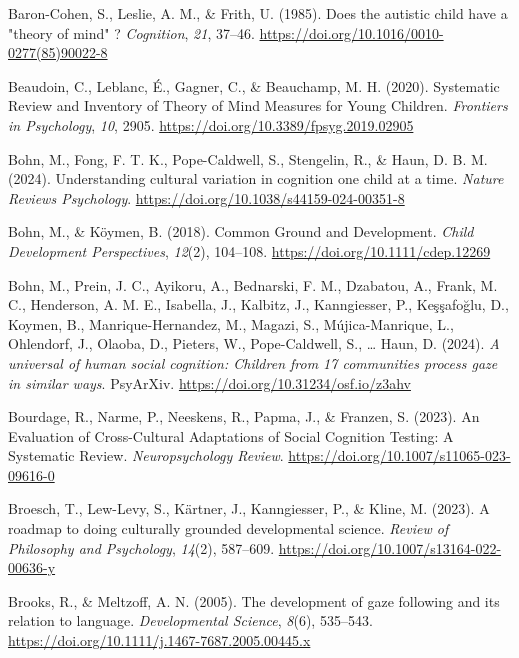 \documentclass[
  man,floatsintext]{apa7}
\newlength{\cslhangindent}
\newenvironment{CSLReferences}[2] %
 {\begin{list}{}{%
  \setlength{\itemindent}{0pt}
  \setlength{\leftmargin}{0pt}
  \setlength{\parsep}{0pt}
  \ifodd #1
   \setlength{\leftmargin}{\cslhangindent}
   \setlength{\itemindent}{-1\cslhangindent}
  \fi
  \setlength{\itemsep}{#2\baselineskip}}}
 {\end{list}}
\begin{document}
\begin{CSLReferences}{1}{0}
Baron-Cohen, S., Leslie, A. M., \& Frith, U. (1985). Does the autistic child have a "theory of mind" ? \emph{Cognition}, \emph{21}, 37--46. \url{https://doi.org/10.1016/0010-0277(85)90022-8}

Beaudoin, C., Leblanc, É., Gagner, C., \& Beauchamp, M. H. (2020). Systematic {Review} and {Inventory} of {Theory} of {Mind Measures} for {Young Children}. \emph{Frontiers in Psychology}, \emph{10}, 2905. \url{https://doi.org/10.3389/fpsyg.2019.02905}

Bohn, M., Fong, F. T. K., Pope-Caldwell, S., Stengelin, R., \& Haun, D. B. M. (2024). Understanding cultural variation in cognition one child at a time. \emph{Nature Reviews Psychology}. \url{https://doi.org/10.1038/s44159-024-00351-8}

Bohn, M., \& Köymen, B. (2018). Common {Ground} and {Development}. \emph{Child Development Perspectives}, \emph{12}(2), 104--108. \url{https://doi.org/10.1111/cdep.12269}

Bohn, M., Prein, J. C., Ayikoru, A., Bednarski, F. M., Dzabatou, A., Frank, M. C., Henderson, A. M. E., Isabella, J., Kalbitz, J., Kanngiesser, P., Keşşafoğlu, D., Koymen, B., Manrique-Hernandez, M., Magazi, S., Mújica-Manrique, L., Ohlendorf, J., Olaoba, D., Pieters, W., Pope-Caldwell, S., \ldots{} Haun, D. (2024). \emph{A universal of human social cognition: {Children} from 17 communities process gaze in similar ways}. PsyArXiv. \url{https://doi.org/10.31234/osf.io/z3ahv}

Bourdage, R., Narme, P., Neeskens, R., Papma, J., \& Franzen, S. (2023). An {Evaluation} of {Cross-Cultural Adaptations} of {Social Cognition Testing}: {A Systematic Review}. \emph{Neuropsychology Review}. \url{https://doi.org/10.1007/s11065-023-09616-0}

Broesch, T., Lew-Levy, S., Kärtner, J., Kanngiesser, P., \& Kline, M. (2023). A roadmap to doing culturally grounded developmental science. \emph{Review of Philosophy and Psychology}, \emph{14}(2), 587--609. \url{https://doi.org/10.1007/s13164-022-00636-y}

Brooks, R., \& Meltzoff, A. N. (2005). The development of gaze following and its relation to language. \emph{Developmental Science}, \emph{8}(6), 535--543. \url{https://doi.org/10.1111/j.1467-7687.2005.00445.x}


\end{CSLReferences}
\end{document}
